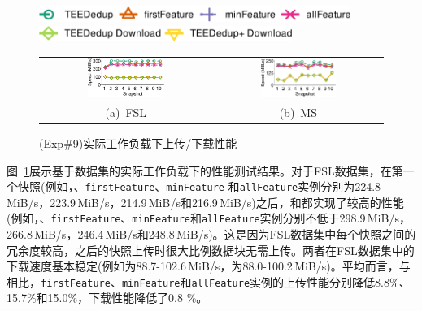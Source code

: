 \begin{figure}[!htb]
    \centering
    \includegraphics[height=0.2in]{pic/featurespy/plot/performance/LANTrace/trace_legend_upload.pdf}\\
    \includegraphics[height=0.2in]{pic/featurespy/plot/performance/LANTrace/trace_legend_download.pdf}\\
    \vspace{3pt}
    \begin{tabular}{@{\ }c@{\ }c}
        \includegraphics[width=0.47\textwidth]{pic/featurespy/plot/performance/LANTrace/trace_fsl.pdf} &
        \includegraphics[width=0.47\textwidth]{pic/featurespy/plot/performance/LANTrace/trace_ms.pdf}    \\
        \mbox{\small (a) FSL}                                                                          &
        \mbox{\small (b) MS}                                                                             \\
    \end{tabular}
    \caption{(Exp\#9)实际工作负载下上传/下载性能}
    \label{fig:featurespy-traceDrivenThroughput}
\end{figure}

图~\ref{fig:featurespy-traceDrivenThroughput}展示基于数据集的实际工作负载下\prototype 的性能测试结果。对于FSL数据集，在第一个快照(例如，\sysnameS、{\tt firstFeature}、{\tt minFeature} 和{\tt allFeature}实例分别为224.8\,MiB/s，223.9\,MiB/s，214.9\,MiB/s和216.9\,MiB/s)之后，\sysnameS 和\prototype 都实现了较高的性能(例如，\sysnameS、{\tt firstFeature}、{\tt minFeature}和{\tt allFeature}实例分别不低于298.9\,MiB/s，266.8\,MiB/s，246.4\,MiB/s和248.8\,MiB/s)。这是因为FSL数据集中每个快照之间的冗余度较高，之后的快照上传时很大比例数据块无需上传。两者在FSL数据集中的下载速度基本稳定(例如\sysnameS 为88.7-102.6\,MiB/s，\prototype 为88.0-100.2\,MiB/s)。平均而言，与\sysnameS 相比，{\tt firstFeature}、{\tt minFeature}和{\tt allFeature}实例的上传性能分别降低8.8\%、15.7\%和15.0\%，下载性能降低了0.8 \%。

